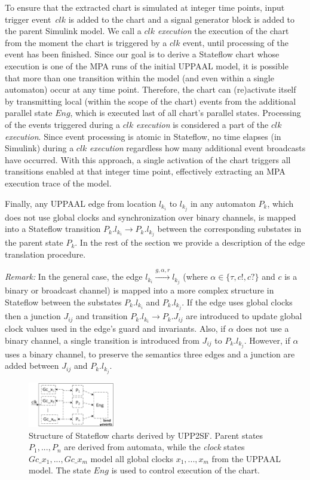 To ensure that the extracted chart is simulated at integer time points, input trigger event~$clk$ is added to the chart and a signal generator block is added to the parent Simulink model. We call a \textit{$clk$ execution} the execution of the chart from the moment the chart is triggered by a $clk$ event, until processing of the event has been finished. Since our goal is to derive a Stateflow chart whose execution is one of the MPA runs of the initial UPPAAL model, it is possible that  more than one transition within the model (and even within a single automaton) occur at any time point. Therefore, the chart can (re)activate itself by transmitting local (within the scope of the chart) events from the additional parallel state $Eng$, which is executed last of all chart's parallel states. Processing of the events triggered during a $clk$ \textit{execution} is considered a part of the $clk$ \textit{execution}. Since event processing is atomic in Stateflow, no time elapses (in Simulink) during a $clk$ \textit{execution} regardless how many additional event broadcasts have occurred. With this approach, a single activation of the chart triggers all transitions enabled at that integer time point, effectively extracting an MPA execution trace of the model. 


Finally, any UPPAAL edge from location $l_{k_i}$ to $l_{k_j}$ in any automaton $P_k$, which does not use global clocks and synchronization over binary channels, is mapped into a Stateflow transition $P_k.l_{k_i}\rightarrow P_k.l_{k_j}$ between the corresponding substates in the parent state $P_k$. In the rest of the section we provide a description of the edge translation procedure. 


\emph{Remark:} In the general case, the edge $l_{k_i}\xrightarrow{g,\alpha,r} l_{k_j}$ (where $\alpha\in\{\tau,c!,c?\}$ and $c$ is a binary or broadcast channel) is mapped into a more complex structure in Stateflow between the substates $P_k.l_{k_i}$ and $P_k.l_{k_j}$. If the edge uses global clocks then a junction $J_{ij}$ and transition $P_k.l_{k_i}\rightarrow P_k.J_{ij}$ are introduced to update global clock values used in the edge's guard and invariants. Also, if $\alpha$ does not use a binary channel, a single transition is introduced from $J_{ij}$ to $P_k.l_{k_j}$. However, if $\alpha$ uses a binary channel, to preserve the semantics three edges and a junction are added between $J_{ij}$ and $P_k.l_{k_j}$.




\begin{figure} [!t]
\center
\includegraphics[width=0.34\textwidth]{figs/chart_GlobalClocks_rev1.png} 
\caption{Structure of Stateflow charts derived by UPP2SF. Parent states $P_1,...,P_n$ are derived from automata, while the \textit{clock} states $Gc\_{x_1},..., Gc\_{x_m}$ model all global clocks $x_1,...,x_m$ from the UPPAAL model. The state $Eng$ is used to control execution of the chart.}
\label{fig:chart}
\end{figure}

